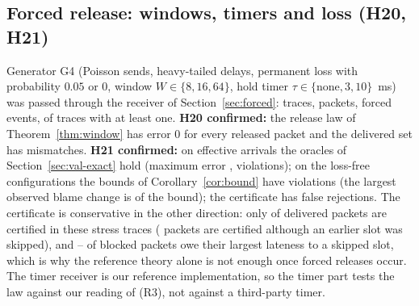 \documentclass[11pt]{article}
\newcommand{\tagC}{\textsc{conf}}
\theoremstyle{definition}
\begin{document}
\subsection{Forced release: windows, timers and loss (H20, H21)}\label{sec:val-forced}
\begin{table}[h]
\centering\footnotesize

\caption{H20/H21 (\tagC{}): 18 receiver configurations, 50 traces each. Forced events are window advances plus timer expiries; ``blocked from skipped slot'' is the share of blocked packets whose largest lateness comes from a slot that was resolved early; ``certified'' is the share of delivered packets certified by Proposition~\ref{prop:applic}.}
\end{table}
Generator G4 (Poisson sends, heavy-tailed delays, permanent loss with probability $0.05$ or $0$, window $W\in\{8,16,64\}$, hold timer $\tau\in\{\text{none},3,10\}$~ms) was passed through the receiver of Section~\ref{sec:forced}: \FvSxTraces{} traces, \FvSxPackets{} packets, \FvSxEvents{} forced events, \FvSxEventShare{} of traces with at least one. \textbf{H20 confirmed:} the release law of Theorem~\ref{thm:window} has error $0$ for every released packet and the delivered set has \FvSxMis{} mismatches. \textbf{H21 confirmed:} on effective arrivals the oracles of Section~\ref{sec:val-exact} hold (maximum error \FvSxErr{}, \FvSxViol{} violations); on the loss-free configurations the bounds of Corollary~\ref{cor:bound} have \FvSxTenViol{} violations (the largest observed blame change is \FvSxTenRatio{} of the bound); the certificate has \FvSxFalse{} false rejections. The certificate is conservative in the other direction: only \FvSxCert{} of delivered packets are certified in these stress traces (\FvSxSkipCert{} packets are certified although an earlier slot was skipped), and \FvSxSkipMin{}--\FvSxSkipMax{} of blocked packets owe their largest lateness to a skipped slot, which is why the reference theory alone is not enough once forced releases occur. The timer receiver is our reference implementation, so the timer part tests the law against our reading of (R3), not against a third-party timer.
\end{document}
